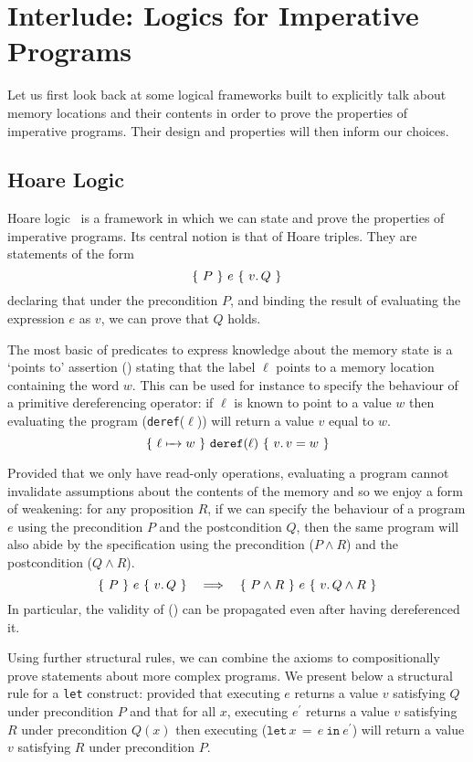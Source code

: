 \section{Interlude: Logics for Imperative Programs}

Let us first look back at some logical frameworks built
to explicitly talk about memory locations and their contents
in order to prove the properties of imperative programs.
%
Their design and properties will then inform our choices.

\subsection{Hoare Logic}

Hoare logic~\citeyearpar{DBLP:journals/cacm/Hoare69}  is a framework in
which we can state and prove the properties of imperative programs.
%
Its central notion is that of Hoare triples. They are statements of
the form
\[ \lbrace~ P ~\rbrace~ e ~\lbrace~ v.\, Q ~\rbrace \]
declaring that under the precondition
$P$, and binding the result of evaluating the expression $e$ as $v$,
we can prove that $Q$ holds.

The most basic of predicates to express knowledge about the memory
state is a `points to' assertion () stating that
the label $\ell$ points to a memory location containing the word $w$.
%
\label{sec:deref}
This can be used for instance to specify the behaviour of a primitive
dereferencing operator: if $\ell$ is known to point to a value $w$ then evaluating
the program (\texttt{deref}($\ell$)) will return a value $v$ equal to $w$.
\[ \lbrace~ \ell \xmapsto{~~} w ~\rbrace~ \texttt{deref}(\ell) ~\lbrace~ v.\, v = w ~\rbrace \]

Provided that we only have read-only operations, evaluating a program cannot
invalidate assumptions about the contents of the memory and so we enjoy a
form of weakening: for any proposition $R$, if we can specify the behaviour
of a program $e$ using the precondition $P$ and the postcondition $Q$,
then the same program will also abide by the specification using the
precondition ($P \wedge R$) and the postcondition ($Q \wedge R$).
\[ \lbrace~ P ~\rbrace~ e ~\lbrace~ v.\, Q ~\rbrace \quad \Longrightarrow \quad \lbrace~ P \wedge R ~\rbrace~ e ~\lbrace~ v.\, Q \wedge R ~\rbrace \]
In particular, the validity of () can be propagated even
after having dereferenced it.

\newcommand{\letin}[3]{\texttt{let}\,#1\,=\,#2~\texttt{in}~#3}

Using further structural rules, we can combine the axioms to compositionally
prove statements about more complex programs. We present below a structural
rule for a \texttt{let} construct: provided that
executing $e$ returns a value $v$ satisfying $Q$ under precondition $P$ and that
for all $x$, executing $e^{\prime}$ returns a value $v$ satisfying $R$ under
precondition $Q(x)$
then executing ($\letin{x}{e}{e^{\prime}}$) will return a value $v$ satisfying $R$
under precondition $P$.

